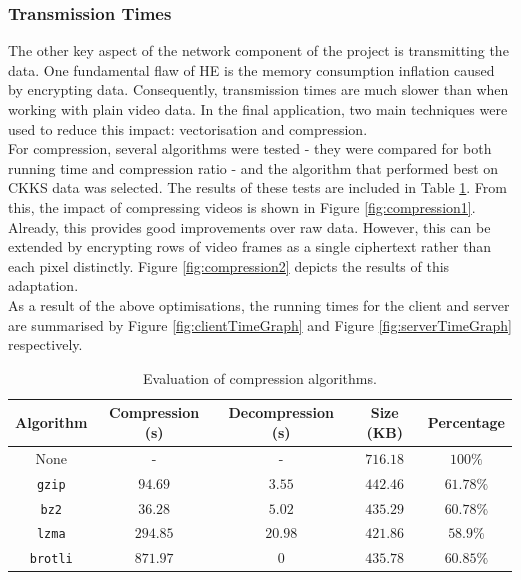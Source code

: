 \setlength{\leftskip}{0cm}
\subsubsection{Transmission Times}
\setlength{\leftskip}{0.5cm}
\indent \indent
The other key aspect of the network component of the project is transmitting the data. One fundamental flaw of HE is the memory consumption inflation caused by encrypting data. Consequently, transmission times are much slower than when working with plain video data. In the final application, two main techniques were used to reduce this impact: vectorisation and compression.
\smallskip \\ \indent
For compression, several algorithms were tested - they were compared for both running time and compression ratio - and the algorithm that performed best on CKKS data was selected. The results of these tests are included in Table \ref{tab:compression}. From this, the impact of compressing videos is shown in Figure \ref{fig:compression1}.
\smallskip \\ \indent
Already, this provides good improvements over raw data. However, this can be extended by encrypting rows of video frames as a single ciphertext rather than each pixel distinctly. Figure \ref{fig:compression2} depicts the results of this adaptation.
\smallskip \\ \indent
As a result of the above optimisations, the running times for the client and server are summarised by Figure \ref{fig:clientTimeGraph} and Figure \ref{fig:serverTimeGraph} respectively.

\begin{table}[ht]
    \centering
    \def\arraystretch{1.25}
    \begin{tabular}{|c||c|c|c|c|}
        \hline
        \textrm{\textbf{Algorithm}} & \textrm{\textbf{Compression} (s)} & \textrm{\textbf{Decompression} (s)} & \textrm{\textbf{Size} (KB)} & \textrm{\textbf{Percentage}}
        \\ \hline \hline
        \textrm{None} & - & - & $716.18$ & $100\%$
        \\ \hline
        \texttt{gzip} & $94.69$ & $3.55$ & $442.46$ & $61.78\%$
        \\ \hline
        \texttt{bz2} & $36.28$ & $5.02$ & $435.29$ & $60.78\%$
        \\ \hline
        \texttt{lzma} & $294.85$ & $20.98$ & $421.86$ & $58.9\%$
        \\ \hline
        \texttt{brotli} & $871.97$ & $0$ & $435.78$  & $60.85\%$
        \\ \hline
    \end{tabular}
    \caption[Compression algorithms]{Evaluation of compression algorithms.}
    \label{tab:compression}
\end{table}

